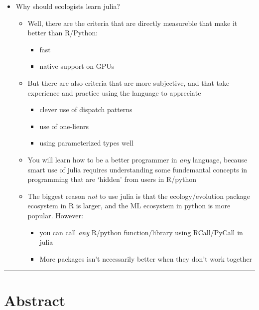 \documentclass[11pt]{article}
\begin{document}
\begin{itemize}
\tightlist
\item
  Why should ecologists learn julia?

  \begin{itemize}
  \tightlist
  \item
    Well, there are the criteria that are directly measureble that make
    it better than R/Python:

    \begin{itemize}
    \tightlist
    \item
      fast
    \item
      native support on GPUs
    \end{itemize}
  \item
    But there are also criteria that are more subjective, and that take
    experience and practice using the language to appreciate

    \begin{itemize}
    \tightlist
    \item
      clever use of dispatch patterns
    \item
      use of one-lienrs
    \item
      using parameterized types well
    \end{itemize}
  \item
    You will learn how to be a better programmer in \emph{any} language,
    because smart use of julia requires understanding some fundemantal
    concepts in programming that are `hidden' from users in R/python
  \item
    The biggest reason \emph{not} to use julia is that the
    ecology/evolution package ecosystem in R is larger, and the ML
    ecosystem in python is more popular. However:

    \begin{itemize}
    \tightlist
    \item
      you can call \emph{any} R/python function/library using
      RCall/PyCall in julia
    \item
      More packages isn't necessarily better when they don't work
      together
    \end{itemize}
  \end{itemize}
\end{itemize}

\begin{center}\rule{0.5\linewidth}{0.5pt}\end{center}

\hypertarget{abstract}{%
\section{Abstract}\label{abstract}}
\end{document}
